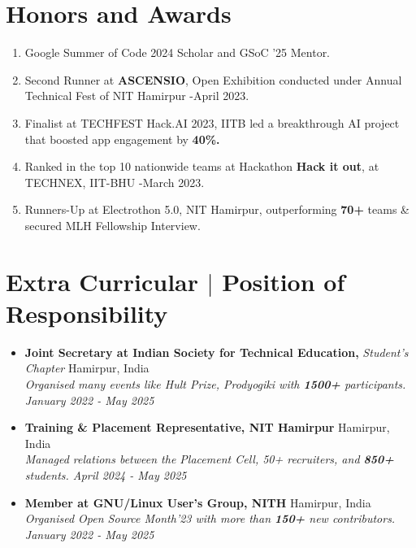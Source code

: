 \documentclass[7pt, legalpaper]{article}
\begin{document}
\section{Honors and Awards}
\begin{enumerate}[leftmargin=*, itemsep=0em]
    \item Google Summer of Code 2024 Scholar and GSoC '25 Mentor.
    \item Second Runner at \textbf{ASCENSIO}, Open Exhibition conducted under Annual Technical Fest of NIT Hamirpur -April 2023.
    \item Finalist at TECHFEST Hack.AI 2023, IITB led a breakthrough AI project that boosted app engagement by \textbf{40\%.}
    \item Ranked in the top 10 nationwide teams at Hackathon \textbf{Hack it out}, at TECHNEX, IIT-BHU -March 2023.
    \item Runners-Up at Electrothon 5.0, NIT Hamirpur, outperforming \textbf{70+} teams \& secured MLH Fellowship Interview.
\end{enumerate}


\section{Extra Curricular $|$ \normalsize{Position of Responsibility}}

\begin{itemize}[leftmargin=*, itemsep=0em]
    \item \normalsize{\textbf {Joint Secretary at Indian Society for Technical Education,} \textit{Student's Chapter} \hfill Hamirpur, India}\\
    \small \textit {Organised many events like Hult Prize, Prodyogiki with \textbf{1500+} participants. \hfill January 2022 - May 2025}
    
    \item \normalsize{\textbf {Training \& Placement Representative, NIT Hamirpur} \hfill Hamirpur, India}\\
    \small \textit{ Managed relations between the Placement Cell, 50+ recruiters, and \textbf{850+} students. \hfill April 2024 - May 2025}
    
    \item  \normalsize{\textbf{Member at GNU/Linux User's Group, NITH} \hfill Hamirpur, India}\\
    \small \textit {Organised Open Source Month'23 with more than \textbf{150+} new contributors. \hfill January 2022 - May 2025}
\end{itemize}
\end{document}
